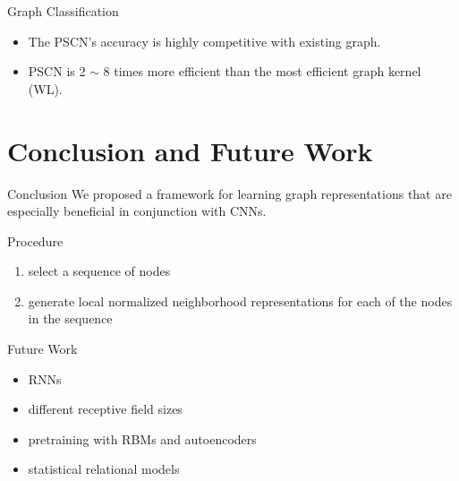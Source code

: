 \documentclass[dvipdfmx]{beamer}
\begin{document}
  \begin{frame}{Graph Classification}
    \begin{itemize}
      \item The PSCN's accuracy is highly competitive with existing graph.
      \item PSCN is 2 $\sim$ 8 times more efficient than the most efficient graph kernel (WL).
    \end{itemize}
  \end{frame}

\section{Conclusion and Future Work}

  \begin{frame}{Conclusion}
    \alert{\Large We proposed a framework for learning graph representations that are especially beneficial in conjunction with CNNs.}
    \vspace{5mm}

    \begin{block}{Procedure}
      \begin{enumerate}
        \item select a sequence of nodes
        \item generate local normalized neighborhood representations for each of the nodes in the sequence
      \end{enumerate}
    \end{block}
  \end{frame}

  \begin{frame}{Future Work}
    \begin{itemize}
      \item RNNs
      \item different receptive field sizes
      \item pretraining with RBMs and autoencoders
      \item statistical relational models
    \end{itemize}
  \end{frame}
\end{document}
